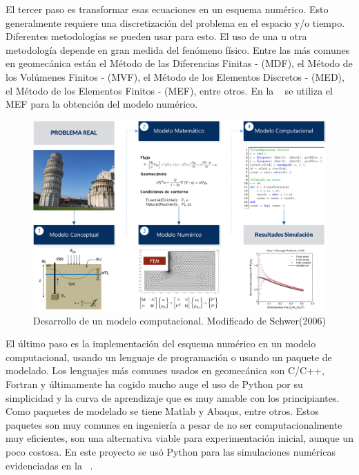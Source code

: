 El tercer paso es transformar esas ecuaciones en un esquema numérico. Esto generalmente requiere una discretización del problema en el espacio y/o tiempo. Diferentes metodologías se pueden usar para esto. El uso de una u otra metodología depende en gran medida del fenómeno físico. Entre las más comunes en geomecánica están el Método de las Diferencias Finitas - (MDF), el Método de los Volúmenes Finitos - (MVF), el Método de los Elementos Discretos - (MED), el Método de los Elementos Finitos - (MEF), entre otros. En la ~ se utiliza el MEF para la obtención del modelo numérico.\bigskip

\begin{figure}[!ht]
\centering
\includegraphics[width=16cm]{Imagenes/Kap_03/Desarrollo_de_Modelo.jpg}
\caption[Desarrollo de un modelo computacional]{Desarrollo de un modelo computacional. Modificado de Schwer(2006) \cite{Schwer2006GuideMechanics}}
\label{fig:fig21}
\end{figure}


El último paso es la implementación del esquema numérico en un modelo computacional, usando un lenguaje de programación o usando un paquete de modelado. Los lenguajes más comunes usados en geomecánica son C/C++, Fortran y últimamente ha cogido mucho auge el uso de Python por su simplicidad y la curva de aprendizaje que es muy amable con los principiantes. Como paquetes de modelado se tiene Matlab y Abaqus, entre otros. Estos paquetes son muy comunes en ingeniería a pesar de no ser computacionalmente muy eficientes, son una alternativa viable para experimentación inicial, aunque un poco costosa. En este proyecto se usó Python para las simulaciones numéricas evidenciadas en la ~.\newpage

